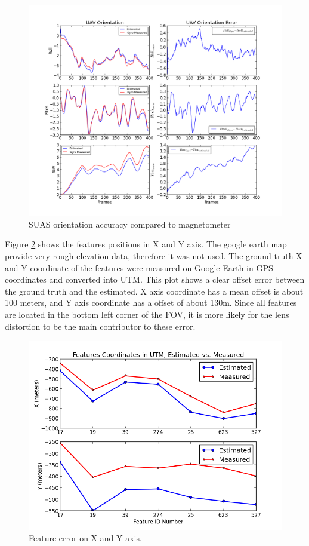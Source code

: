 \begin{figure}[h]
\centering
\includegraphics[width=13cm, keepaspectratio=true]
{./Figures/fltfig/airport/UAV_orientation_and_error.png}
\caption{SUAS orientation accuracy compared to magnetometer}
\label{fltfig:14}
\end{figure}
\FloatBarrier

Figure \ref{fltfig:15} shows the features positions in X and Y axis.
The google earth map provide very rough elevation data, therefore it
was not used. The ground truth X and Y coordinate of the features were
measured on Google Earth in GPS coordinates and converted into UTM.
This plot shows a clear offset error between the ground truth and the
estimated. X axis coordinate has a mean offset is about 100 meters,
and Y axis coordinate has a offset of about 130m. Since all features
are located in the bottom left corner of the FOV, it is more likely
for the lens distortion to be the main contributor to these error.


\begin{figure}[h]
\centering
\includegraphics[width=13cm, keepaspectratio=true]
{./Figures/fltfig/airport/Feature_plot_(x,y).png}
\caption{Feature error on X and Y axis. }
\label{fltfig:15}
\end{figure}

